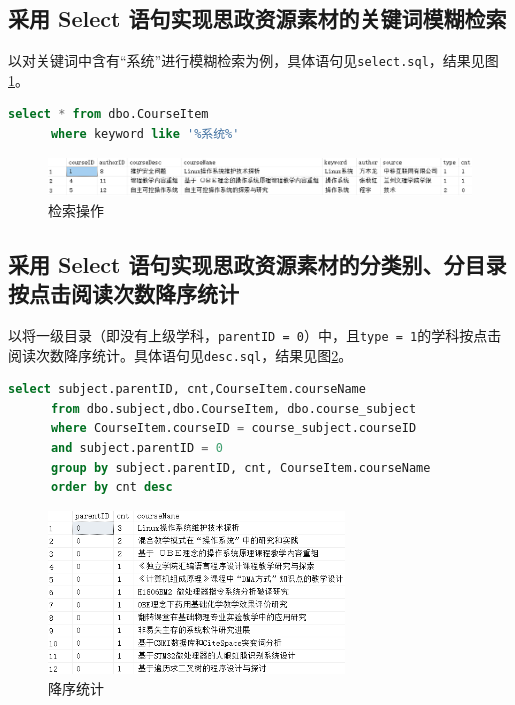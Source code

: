 \documentclass[11pt]{article}
\begin{document}
  \subsection{采用 Select 语句实现思政资源素材的关键词模糊检索}
  以对关键词中含有“系统”进行模糊检索为例，具体语句见\verb|select.sql|，结果见图\ref{fig:select}。

  \begin{file}
    \begin{lstlisting}[language=sql]
      select * from dbo.CourseItem 
      where keyword like '%系统%'
    \end{lstlisting}
  \end{file}

  \begin{figure}[h]
    \centering
    \includegraphics[width=\textwidth]{select.png}
    \caption{检索操作}
    \label{fig:select}
  \end{figure}

  \subsection{采用 Select 语句实现思政资源素材的分类别、分目录按点击阅读次数降序统计}
  以将一级目录（即没有上级学科，\verb|parentID = 0|）中，且\verb|type = 1|的学科按点击阅读次数降序统计。具体语句见\verb|desc.sql|，结果见图\ref{fig:desc}。

  \begin{file}
    \begin{lstlisting}[language=sql]
      select subject.parentID, cnt,CourseItem.courseName 
      from dbo.subject,dbo.CourseItem, dbo.course_subject
      where CourseItem.courseID = course_subject.courseID 
      and subject.parentID = 0
      group by subject.parentID, cnt, CourseItem.courseName
      order by cnt desc
    \end{lstlisting}
  \end{file}

  \begin{figure}[h]
    \centering
    \includegraphics[width=0.7\textwidth]{desc.png}
    \caption{降序统计}
    \label{fig:desc}
  \end{figure}
\end{document}
